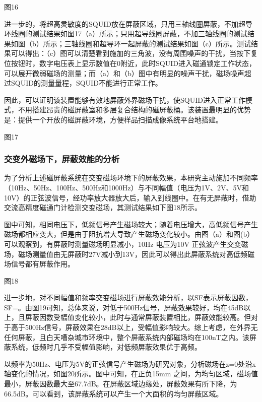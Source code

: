 \documentclass[a4paper,12pt，twoside]{ctexart}
\begin{document}
	图16\par 
	进一步的，将超高灵敏度的SQUID放在屏蔽区域，只用三轴线圈屏蔽，不加超导环线圈的测试结果如图17（a）所示；只用超导线圈屏蔽，不加三轴线圈的测试结果如图（b）所示；三轴线圈和超导环一起屏蔽的测试结果如图（c）所示。测试结果可以得出：（c）图可以清楚看到施加的三角波，没有周围噪声的干扰，当按下复位按钮时，数字电压表上显示数值在0附近，此时SQUID进入磁通锁定工作状态，可以展开微弱磁场的测量；而（a）和（b）图中有明显的噪声干扰，磁场噪声超过SQUID的测量量程，SQUID不能进行正常工作。\par
	因此，可以证明该装置能够有效地屏蔽外界磁场干扰，使SQUID进入正常工作模式，不用搭建昂贵的磁屏蔽室和多层复合结构的磁屏蔽桶。该装置最明显的优势是：提供一个开放的磁屏蔽环境，方便样品扫描成像系统平台地搭建。\par 
	
	图17\par 
	\subsubsection{交变外磁场下，屏蔽效能的分析}
	 为了分析上述磁屏蔽系统在交变磁场环境下的屏蔽效果，本研究主动施加不同频率（10Hz、50Hz、100Hz、500Hz和1000Hz）与不同幅值（电压为1V、2V、5V和10V）的正弦波信号，经功率放大器放大后，输入到线圈中。在有无屏蔽时，借助交流高精度磁通门计检测交变磁场，其测试结果如下图18所示。\par
	 图中可知，相同电压下，低频信号产生磁场较大；随着电压增大，高低频信号产生磁场都相应变大，但是由于阻抗增大导致产生磁场变化较小。由图（a）和图(b）可以观察到，有屏蔽时测量磁场明显减小，10Hz 电压为10V 正弦波产生交变磁场，磁场测量值由无屏蔽时27V减小到13V，因此可以得出此屏蔽系统对高低频磁场信号都有屏蔽作用。\par 
	 图18\par  	
	 
	 进一步地，对不同幅值和频率交变磁场进行屏蔽效能分析，以SF表示屏蔽因数，SF=。由图19可知，总体来说，对低于500Hz信号，屏蔽效果较好，均在45dB以上，且屏蔽因数受幅值变化较小，此时与通常屏蔽装置相比，屏蔽效能较高。但对于高于500Hz信号，屏蔽效果在28dB以上，受幅值影响较大。综上考虑，在外界无任何屏蔽，且白天嘈杂城市环境中，整个屏蔽系统内部磁场均在100nT之内。该屏蔽系统，低频时几乎不受幅值影响，对低频屏蔽效果优于高频。\par
	 以频率为50Hz、电压为5V的正弦信号产生磁场为研究对象，分析磁场在z=0处沿x轴变化的情况，如图20所示。图中可知，在正负15mm 之间，为均匀区域，磁场值最小，屏蔽因数最大至67.7dB。在屏蔽区域边缘处，屏蔽效果有所下降，为66.5dB。可以看到，该屏蔽系统可以产生一个大面积的均匀屏蔽区域。\par
	 
\end{document}
